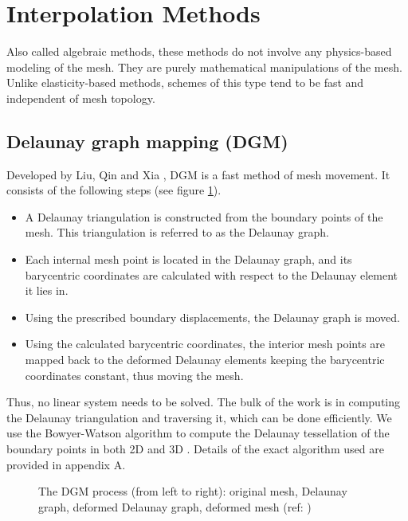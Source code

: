  \section{Interpolation  Methods}
 Also called algebraic methods, these methods do not involve any physics-based modeling of the mesh. They are purely mathematical manipulations of the mesh. Unlike elasticity-based methods, schemes of this type tend to be fast and independent of mesh topology.
 
 \subsection{Delaunay graph mapping (DGM)}
 \label{sec:dgm}
 Developed by Liu, Qin and Xia \cite{mm:dgm}, DGM is a fast method of mesh movement. It consists of the following steps (see figure \ref{fig:dgmprocess}).
 \begin{itemize}
 	\item A Delaunay triangulation is constructed from the boundary points of the mesh. This triangulation is referred to as the Delaunay graph.
 	\item Each internal mesh point is located in the Delaunay graph, and its barycentric coordinates are calculated with respect to the Delaunay element it lies in.
 	\item Using the prescribed boundary displacements, the Delaunay graph is moved.
 	\item Using the calculated barycentric coordinates, the interior mesh points are mapped back to the deformed Delaunay elements keeping the barycentric coordinates constant, thus moving the mesh.
 \end{itemize}
 Thus, no linear system needs to be solved. The bulk of the work is in computing the Delaunay triangulation and traversing it, which can be done efficiently. We use the Bowyer-Watson algorithm to compute the Delaunay tessellation of the boundary points in both 2D and 3D \cite{bowyer}. Details of the exact algorithm used are provided in appendix A.
 
 \begin{figure}
 	\centering
 	\caption{The DGM process (from left to right): original mesh, Delaunay graph, deformed Delaunay graph, deformed mesh (ref: \cite{mm:dgm})}
 	\label{fig:dgmprocess}
 \end{figure}
 
